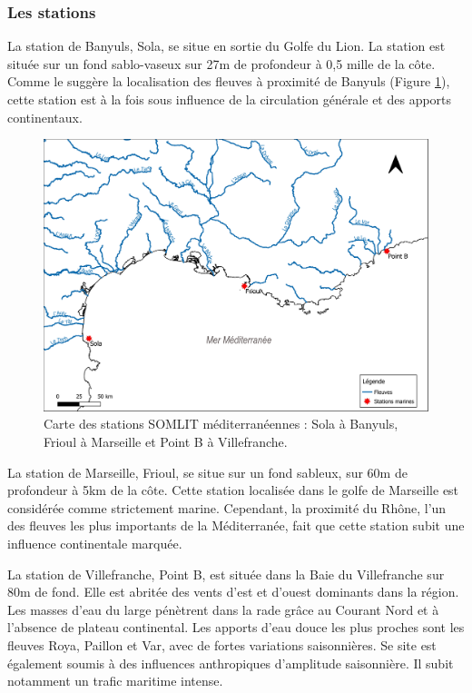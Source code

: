 \documentclass[12pt]{article}
\begin{document}
\subsubsection{Les stations}

La station de Banyuls, Sola, se situe en sortie du Golfe du Lion. La station est située sur un fond sablo-vaseux sur 27m de profondeur à 0,5 mille de la côte. Comme le suggère la localisation des fleuves à proximité de Banyuls (Figure \ref{map}), cette station est à la fois sous influence de la circulation générale et des apports continentaux. 

\begin{figure}
\centering
\includegraphics[width=.7\textwidth]{fig/MM_map.pdf}
\caption{Carte des stations SOMLIT méditerranéennes : Sola à Banyuls, Frioul à Marseille et Point B à Villefranche.}
\label{map}
\end{figure}

La station de Marseille, Frioul, se situe sur un fond sableux, sur 60m de profondeur à 5km de la côte. Cette station localisée dans le golfe de Marseille est considérée comme strictement marine. Cependant, la proximité du Rhône, l’un des fleuves les plus importants de la Méditerranée, fait que cette station subit une influence continentale marquée. 

La station de Villefranche, Point B, est située dans la Baie du Villefranche sur 80m de fond. Elle est abritée des vents d’est et d’ouest dominants dans la région. Les masses d’eau du large pénètrent dans la rade grâce au Courant Nord et à l’absence de plateau continental. Les apports d’eau douce les plus proches sont les fleuves Roya, Paillon et Var, avec de fortes variations saisonnières. Se site est également soumis à des influences anthropiques d’amplitude saisonnière. Il subit notamment un trafic maritime intense. 
\end{document}
